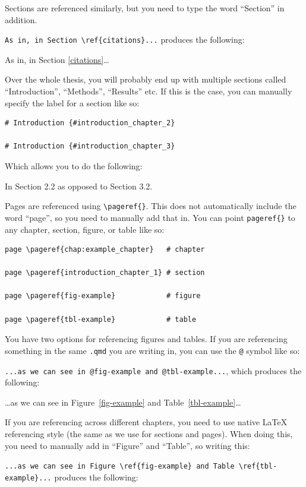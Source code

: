 \documentclass[../main.tex]{subfiles}
\begin{document}
Sections are referenced similarly, but you need to type the word
``Section'' in addition.

\texttt{As\ in,\ in\ Section\ \textbackslash{}ref\{citations\}...}
produces the following:

As in, in Section \ref{citations}\ldots{}

Over the whole thesis, you will probably end up with multiple sections
called ``Introduction'', ``Methods'', ``Results'' etc. If this is the
case, you can manually specify the label for a section like so:

\begin{verbatim}
# Introduction {#introduction_chapter_2}

# Introduction {#introduction_chapter_3}
\end{verbatim}

Which allows you to do the following:

In Section 2.2 as opposed to Section 3.2.

Pages are referenced using \texttt{\textbackslash{}pageref\{\}}. This
does not automatically include the word ``page'', so you need to
manually add that in. You can point \texttt{pageref\{\}} to any chapter,
section, figure, or table like so:

\begin{verbatim}
page \pageref{chap:example_chapter}   # chapter

page \pageref{introduction_chapter_1} # section

page \pageref{fig-example}            # figure

page \pageref{tbl-example}            # table
\end{verbatim}

You have two options for referencing figures and tables. If you are
referencing something in the same \texttt{.qmd} you are writing in, you
can use the \texttt{@} symbol like so:

\texttt{...as\ we\ can\ see\ in\ @fig-example\ and\ @tbl-example...},
which produces the following:

\ldots as we can see in Figure~\ref{fig-example} and
Table~\ref{tbl-example}\ldots{}

If you are referencing across different chapters, you need to use native
LaTeX referencing style (the same as we use for sections and pages).
When doing this, you need to manually add in ``Figure'' and ``Table'',
so writing this:

\texttt{...as\ we\ can\ see\ in\ Figure\ \textbackslash{}ref\{fig-example\}\ and\ Table\ \textbackslash{}ref\{tbl-example\}...}
produces the following:
\end{document}
